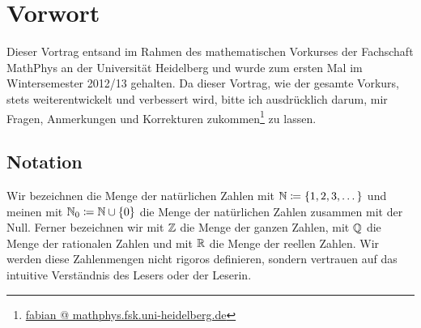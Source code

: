 \section{Vorwort}

Dieser Vortrag entsand im Rahmen des mathematischen Vorkurses der
Fachschaft MathPhys an der Universität Heidelberg und wurde zum ersten Mal
im Wintersemester 2012/13 gehalten. Da dieser Vortrag, wie der gesamte
Vorkurs, stets weiterentwickelt und verbessert wird, bitte ich ausdrücklich
darum, mir Fragen, Anmerkungen und Korrekturen
zukommen\footnote{\href{mailto:fabian@mathphys.fsk.uni-heidelberg.de}{fabian
    @ mathphys.fsk.uni-heidelberg.de}} zu lassen.

\subsection*{Notation}

Wir bezeichnen die Menge der natürlichen Zahlen mit $\mathbb N \coloneqq \{
1,2,3,\dots \}$ und meinen mit $\mathbb N_{0} \coloneqq \mathbb N\cup\{0\}$ die Menge der
natürlichen Zahlen zusammen mit der Null. Ferner bezeichnen wir mit $\mathbb Z$
die Menge der ganzen Zahlen, mit $\mathbb Q$ die Menge der rationalen Zahlen und
mit $\mathbb R$ die Menge der reellen Zahlen. Wir werden diese Zahlenmengen nicht
rigoros definieren, sondern vertrauen auf das intuitive Verständnis des
Lesers oder der Leserin.

